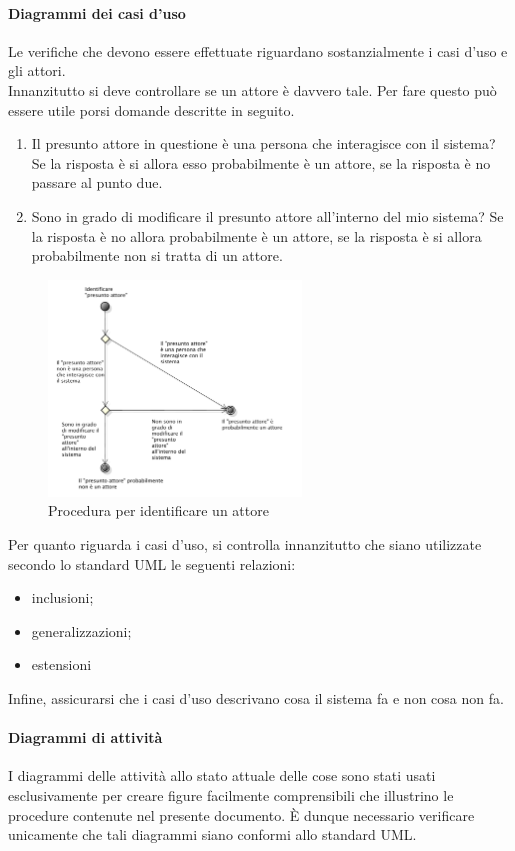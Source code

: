 			\paragraph{Diagrammi dei casi d'uso}
				Le verifiche che devono essere effettuate riguardano sostanzialmente i casi d'uso e gli attori.\\
				Innanzitutto si deve controllare se un attore è davvero tale. Per fare questo può essere utile porsi domande descritte in seguito.
				\begin{enumerate}
					\item Il presunto attore in questione è una persona che interagisce con il sistema? Se la risposta è si allora esso probabilmente è un attore, se la risposta è no passare al punto due.
					\item Sono in grado di modificare il presunto attore all'interno del mio sistema? Se la risposta è no allora probabilmente è un attore, se la risposta è si allora probabilmente non si tratta di un attore.
				\end{enumerate}
				\begin{figure}[H]
					\centering
					\includegraphics[width=0.6\textwidth]{NormeDiProgetto/Pics/VerificaAttori}
					\caption{Procedura per identificare un attore}
				\end{figure}
				Per quanto riguarda i casi d'uso, si controlla innanzitutto che siano utilizzate secondo lo standard UML le seguenti relazioni:
				\begin{itemize}
					\item inclusioni;
					\item generalizzazioni;
					\item estensioni
				\end{itemize}
				Infine, assicurarsi che i casi d'uso descrivano cosa il sistema fa e non cosa non fa.
			\paragraph{Diagrammi di attività}
				I diagrammi delle attività allo stato attuale delle cose sono stati usati esclusivamente per creare figure facilmente comprensibili che illustrino le procedure contenute nel presente documento. È dunque necessario verificare unicamente che tali diagrammi siano conformi allo standard UML.
